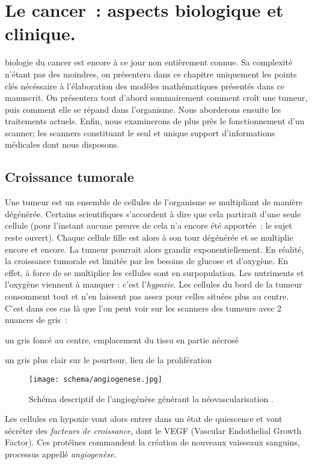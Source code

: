 \documentclass[main.tex]{subfiles}
\begin{document}
\chapter{Le cancer~: aspects biologique et clinique.}
 biologie du cancer est encore à ce jour non entièrement connue. Sa complexité n'étant pas des moindres, on présentera dans ce chapitre uniquement les points clés nécéssaire à l'élaboration des modèles mathématiques présentés dans ce manuscrit. On présentera tout d'abord sommairement comment croît une tumeur, puis comment elle se répand dans l'organisme. Nous aborderons ensuite les traitements actuels. Enfin, nous examinerons de plus près le fonctionnement d'un scanner; les scanners constituant le seul et unique support d'informations médicales dont nous disposons. 

\section{Croissance tumorale}
Une tumeur est un ensemble de cellules de l'organisme se multipliant de manière dégénérée. Certains scientifiques s'accordent à dire que cela partirait d'une seule cellule (pour l'instant aucune preuve de cela n'a encore été apportée~: le sujet reste ouvert). Chaque cellule fille est alors à son tour dégénérée et se multiplie encore et encore. La tumeur pourrait alors grandir exponentiellement. En réalité, la croissance tumorale est limitée par les besoins de glucose et d'oxygène. En effet, à force de se multiplier les cellules sont en surpopulation. Les nutriments et l'oxygène viennent à manquer : c'est l'\emph{hypoxie}. Les cellules du bord de la tumeur consomment tout et n'en laissent pas assez pour celles situées plus au centre. C'est dans ces cas là que l'on peut voir sur les scanners des tumeurs avec 2 nuances de gris~:
\begin{myitemize}
\item un gris foncé au centre, emplacement du tissu en partie nécrosé
\item un gris plus clair sur le pourtour, lieu de la prolifération
\end{myitemize}
\begin{wrapfigure}[18]{R}{.5\textwidth}
\texttt{[image: schema/angiogenese.jpg]}
\caption{\label{fig:schema_angio} Schéma descriptif de l'angiogénèse générant la néovascularisation \cite{web1}.}
\end{wrapfigure}
Les cellules en hypoxie vont alors entrer dans un état de quiescence et vont sécréter des \emph{facteurs de croissance}, dont le VEGF (Vascular Endothelial Growth Factor). Ces protéïnes commandent la création de nouveaux vaisseaux sanguins, processus appellé \emph{angiogenèse}. 
\end{document}
